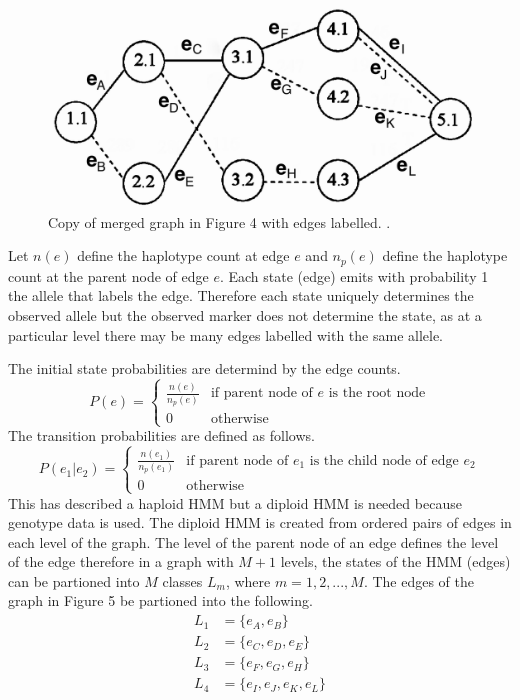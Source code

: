 \documentclass[a4paper,11pt,twoside,abstraction,titlepage]{article}
\begin{document}
\begin{figure}[htp!]
\begin{center}
\centerline{\includegraphics[scale=0.08]{fig5}}
\caption{Copy of merged graph in Figure 4 with edges labelled. \cite{beagle1}.}
\end{center}
\vspace{-20pt}
\end{figure}

Let $n(e)$ define the haplotype count at edge $e$ and $n_p(e)$ define the haplotype count at the parent node of edge $e$.  Each state (edge) emits with probability 1 the allele that labels the edge.  Therefore each state uniquely determines the observed allele but the observed marker does not determine the state, as at a particular level there may be many edges labelled with the same allele.

The initial state probabilities are determind by the edge counts.  
\begin{equation*}
P(e) = 
\begin{cases}
\frac{n(e)}{n_p(e)} & \mbox{if parent node of $e$ is the root node} \\
0  & \mbox{otherwise}
\end{cases}
\end{equation*}
The transition probabilities are defined as follows.
\begin{equation*}
P(e_1|e_2) = 
\begin{cases}
\frac{n(e_1)}{n_p(e_1)} & \mbox{if parent node of $e_1$ is the child node of edge $e_2$} \\
0  & \mbox{otherwise}
\end{cases}
\end{equation*}
This has described a haploid HMM but a diploid HMM is needed because genotype data is used.  The diploid HMM is created from ordered pairs of edges in each level of the graph.  The level of the parent node of an edge defines the level of the edge therefore in a graph with $M+1$ levels, the states of the HMM (edges) can be partioned into $M$ classes $L_m$, where $m=1,2,...,M$.  The edges of the graph in Figure 5 be partioned into the following.
\vspace{-10pt}
\begin{align*}
L_1 &= \{e_{A}, e_{B}\} \\
L_2 &= \{e_{C}, e_{D}, e_{E}\}\\
L_3 &= \{e_{F}, e_{G}, e_{H}\} \\
L_4 &= \{e_{I}, e_{J}, e_{K}, e_{L}\}
\end{align*}
\end{document}
